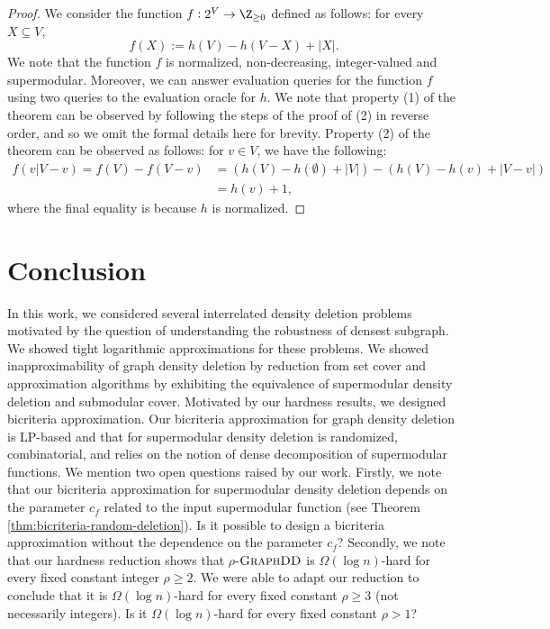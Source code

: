 \documentclass{article}
\newcommand{\dds}{\ensuremath{\textsc{GraphDD}}\xspace}
\begin{document}
\thmSubmodCovertosdds*
\begin{proof}
    We consider the function $f:2^V\rightarrow\Z_{\geq 0}$ defined as follows: 
    for every $X \subseteq V$,
$$ f(X) := h(V) - h(V - X) + |X|.$$
We note that the function $f$ is normalized, non-decreasing, integer-valued and supermodular. Moreover, we  can answer evaluation queries for the function $f$ using two queries to the evaluation oracle for $h$. 
We note that property (1) of the theorem can be observed by following the steps of the proof of (2) in reverse order, and so we omit the formal details here for brevity. Property (2) of the theorem can be observed as follows: for $v \in V$, we have the following:
\begin{align*}
f(v|V - v) = f(V) - f(V - v) &= (h(V) - h(\emptyset) + |V|) - (h(V) - h(v) + |V - v|)\\
&= h(v) + 1,
\end{align*}
where the final equality is because $h$ is normalized.
\end{proof} \section{Conclusion}\label{sec:conclusion}
In this work, we considered several interrelated density deletion problems motivated by the question of understanding the robustness of densest subgraph. We showed tight logarithmic approximations for these problems. We showed inapproximability of graph density deletion by reduction from set cover and approximation algorithms by exhibiting the equivalence of supermodular density deletion and submodular cover. Motivated by our hardness results, we designed bicriteria approximation. Our bicriteria approximation for graph density deletion is LP-based and that for supermodular density deletion is randomized, combinatorial, and relies on the notion of dense decomposition of supermodular functions. 
We mention two open questions raised by our work. Firstly, we note that our bicriteria approximation for supermodular density deletion depends on the parameter $c_f$ related to the input supermodular function (see Theorem \ref{thm:bicriteria-random-deletion}). Is it possible to design a bicriteria approximation without the dependence on the parameter $c_f$? Secondly, we note that our hardness reduction shows that $\rho$-\dds is $\Omega(\log{n})$-hard for every fixed constant integer $\rho\ge 2$. We were able to adapt our reduction to conclude that it is $\Omega(\log{n})$-hard for every fixed constant $\rho\ge 3$ (not necessarily integers). Is it $\Omega(\log{n})$-hard for every fixed constant $\rho>1$?
\end{document}
